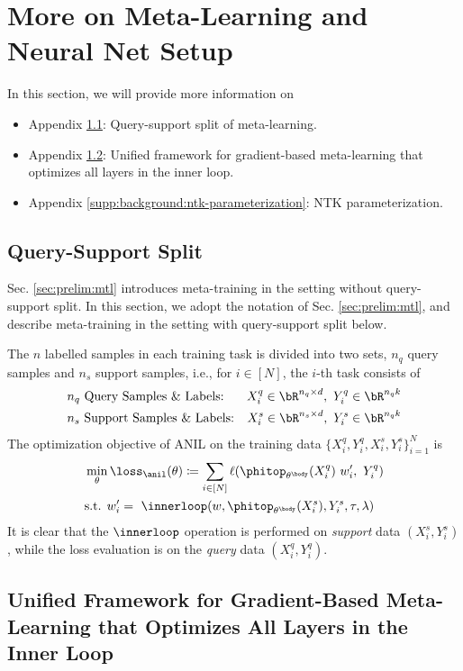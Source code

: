 \documentclass{article}
\begin{document}
\section{More on Meta-Learning and Neural Net Setup}\label{supp:background}
In this section, we will provide more information on
\begin{itemize}
    \item Appendix \ref{supp:background:query-support-split}: Query-support split of meta-learning.
    \item Appendix \ref{supp:background:unified-framework}: Unified framework for gradient-based meta-learning that optimizes all layers in the inner loop.
    \item Appendix \ref{supp:background:ntk-parameterization}: NTK parameterization.
\end{itemize}

\subsection{Query-Support Split}\label{supp:background:query-support-split}
Sec. \ref{sec:prelim:mtl} introduces meta-training in the setting without query-support split. In this section, we adopt the notation of Sec. \ref{sec:prelim:mtl}, and describe meta-training in the setting with query-support split below.

The $n$ labelled samples in each training task is divided into two sets, $n_q$ query samples and $n_s$ support samples, i.e., for $i\in[N]$, the $i$-th task consists of 
\begin{align*}
&\text{$n_q$ Query Samples \& Labels:} &X_i^q \in \bR^{n_q \times d}, ~Y_i^q \in \bR^{n_q k}\\
&\text{$n_s$ Support Samples \& Labels:} &X_i^s \in \bR^{n_s \times d},~ Y_i^s \in \bR^{n_q k}
\end{align*}
The optimization objective of ANIL on the training data $\{X_i^q, Y_i^q, X_i^s, Y_i^s\}_{i=1}^N$ is
\begin{align}
    &\min_{\theta} \loss_\anil(\theta) \coloneqq \sum_{i\in[N]} \ell(\phitop_{\theta^\body}(X_i^q) ~ w_i', ~Y_i^q) \\
    &\text{s.t. }w_i'=~\innerloop(w, \phitop_{\theta^\body}(X_i^s), Y_i^s, \tau,\lambda)
\end{align}
It is clear that the $\innerloop$ operation is performed on \textit{support} data $(X_i^s,Y_i^s)$, while the loss evaluation is on the \textit{query} data $(X_i^q,Y_i^q)$.

\subsection{Unified Framework for Gradient-Based Meta-Learning that Optimizes All Layers in the Inner Loop}\label{supp:background:unified-framework}
\end{document}
